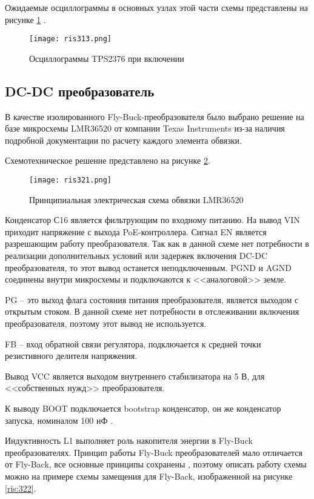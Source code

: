 Ожидаемые осциллограммы в основных узлах этой части схемы представлены на рисунке 
\ref{ris:313} \cite{TPS2376:datasheet}.

\begin{figure}[H]
    \centering
    \texttt{[image: ris313.png]}
    \caption{Осциллограммы TPS2376 при включении}
    \label{ris:313}
\end{figure}

\subsection{DC-DC преобразователь}
\hspace{1cm} 

В качестве изолированного Fly-Buck-преобразователя было выбрано решение на базе микросхемы LMR36520 
от компании Texas Instruments из-за наличия подробной документации по расчету каждого элемента
обвязки. 

Схемотехническое решение представлено на рисунке \ref{ris:321}.

\begin{figure}[H]
    \centering
    \texttt{[image: ris321.png]}
    \caption{Принципиальная электрическая схема обвязки LMR36520}
    \label{ris:321}
\end{figure}

Конденсатор С16 является фильтрующим по входному питанию. На вывод VIN приходит напряжение
с выхода PoE-контроллера. Сигнал EN является разрешающим работу преобразователя. Так как
в данной схеме нет потребности в реализации дополнительных условий или задержек включения
DC-DC преобразователя, то этот вывод останется неподключенным. PGND и AGND соединены внутри 
микросхемы и подключаются к <<аналоговой>> земле. 

PG -- это выход флага состояния питания преобразователя, является выходом с открытым стоком. 
В данной схеме нет потребности в отслеживании включения преобразователя, поэтому этот вывод не 
используется. 

FB -- вход обратной связи регулятора, подключается к средней точки резистивного делителя
напряжения.

Вывод VCC является выходом внутреннего стабилизатора на 5 В, для <<собственных нужд>> преобразователя.

К выводу BOOT подключается bootstrap конденсатор, он же конденсатор запуска, номиналом 100 нФ 
\cite{LMR36520:datasheet}. 

Индуктивность L1 выполняет роль накопителя энергии в Fly-Buck преобразователях. 
Принцип работы Fly-Buck преобразователей мало отличается от Fly-Back, все основные принципы сохранены
\cite{IsoTopol},
поэтому описать работу схемы можно на примере схемы замещения для Fly-Back, 
изображенной на рисунке \ref{ris:322}.


